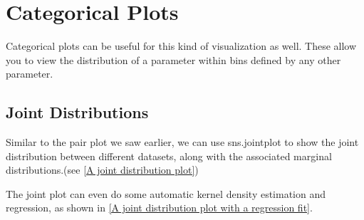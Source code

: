 \section{Categorical Plots}
Categorical plots can be useful for this kind of visualization as well. These allow you
to view the distribution of a parameter within bins defined by any other parameter.

\subsection*{Joint Distributions}
Similar to the pair plot we saw earlier, we can use sns.jointplot to show the joint
distribution between different datasets, along with the associated marginal distributions.(see \autoref{A joint distribution plot})

The joint plot can even do some automatic kernel density estimation and regression, as shown in \autoref{A joint distribution plot with a regression fit}.

